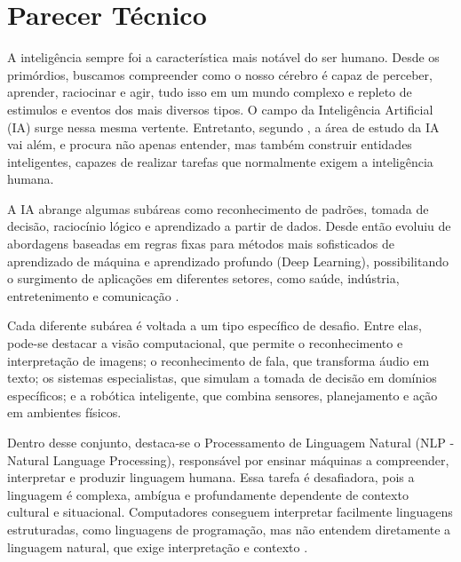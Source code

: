 \chapter{Parecer Técnico} \label{cha:parecertecnico}

A inteligência sempre foi a característica mais notável do ser humano. Desde os primórdios, buscamos compreender como o nosso cérebro é capaz de perceber, aprender, raciocinar e agir, tudo isso em um mundo complexo e repleto de estimulos e eventos dos mais diversos tipos. O campo da Inteligência Artificial (IA) surge nessa mesma vertente. %
Entretanto, segundo \textcite{russell2022}, a área de estudo da IA vai além, e procura não apenas entender, mas também construir entidades inteligentes, capazes de realizar tarefas que normalmente exigem a inteligência humana.

A IA abrange algumas subáreas como reconhecimento de padrões, tomada de decisão, raciocínio lógico e aprendizado a partir de dados. Desde então evoluiu de abordagens baseadas em regras fixas para métodos mais sofisticados de aprendizado de máquina e aprendizado profundo (Deep Learning), possibilitando o surgimento de aplicações em diferentes setores, como saúde, indústria, entretenimento e comunicação \cite{nilsson2010quest}.


Cada diferente subárea é  voltada a um tipo específico de desafio. Entre elas, pode-se destacar a visão computacional, que permite o reconhecimento e interpretação de imagens; o reconhecimento de fala, que transforma áudio em texto; os sistemas especialistas, que simulam a tomada de decisão em domínios específicos; e a robótica inteligente, que combina sensores, planejamento e ação em ambientes físicos.


Dentro desse conjunto, destaca-se o Processamento de Linguagem Natural (NLP - Natural Language Processing), responsável por ensinar máquinas a compreender, interpretar e produzir linguagem humana. Essa tarefa é desafiadora, pois a linguagem é complexa, ambígua e profundamente dependente de contexto cultural e situacional. Computadores conseguem interpretar facilmente linguagens estruturadas, como linguagens de programação, mas não entendem diretamente a linguagem natural, que exige interpretação e contexto \cite{russell2022}.

